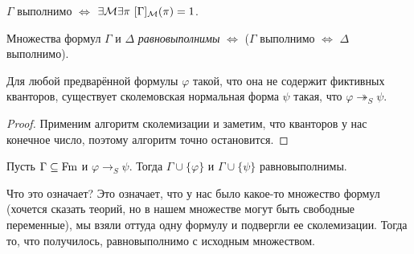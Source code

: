 \begin{definition}
    $\Gamma$ выполнимо $\iff$ $\exists \mathcal{M} \exists \pi~ [\Gamma]_{\mathcal{M}}(\pi) = 1$.
\end{definition}

\begin{definition}
    Множества формул $\Gamma$ и $\Delta$ {\it равновыполнимы} $\iff$ ($\Gamma$ выполнимо $\iff$ $\Delta$ выполнимо).
\end{definition}

\begin{statement}
    Для любой предварённой формулы $\varphi$ такой, что она не содержит фиктивных кванторов, существует сколемовская нормальная форма $\psi$ такая, что $\varphi \twoheadrightarrow_{S} \psi$.
\end{statement}

\begin{proof}
    Применим алгоритм сколемизации и заметим, что кванторов у нас конечное число, поэтому алгоритм точно остановится.
\end{proof}

\begin{theorem}[о сколемизации]
    Пусть $\Gamma \subseteq \mathrm{Fm}$ и $\varphi \to_{S} \psi$.
    Тогда $\Gamma \cup \{\varphi\}$ и $\Gamma \cup \{\psi\}$ равновыполнимы.
\end{theorem}

Что это означает?
Это означает, что у нас было какое-то множество формул (хочется сказать теорий, но в нашем множестве могут быть свободные переменные), мы взяли оттуда одну формулу и подвергли ее сколемизации.
Тогда то, что получилось, равновыполнимо с исходным множеством.

